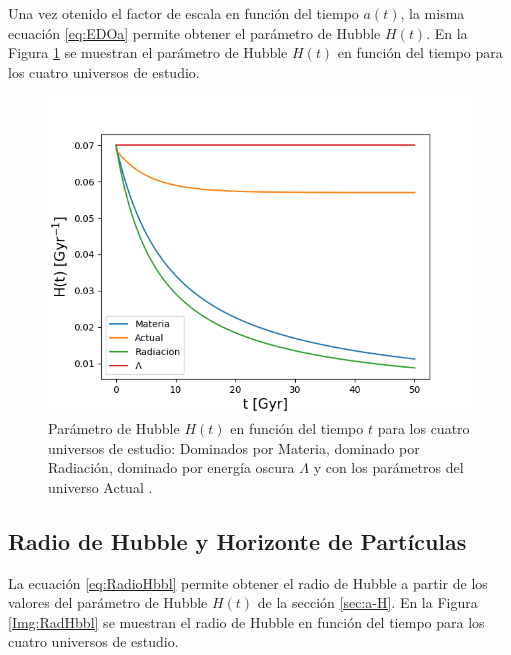 \documentclass[twoside]{article}
\begin{document}
				Una vez otenido el factor de escala en función del tiempo $a(t)$, la misma ecuación \ref{eq:EDOa} permite obtener el parámetro de Hubble $H(t)$. En la Figura \ref{Img:ParametroHbbl} se muestran el parámetro de Hubble $H(t)$ en función del tiempo para los cuatro universos de estudio.

					\begin{figure}[H]
						\centering
						\includegraphics[scale=0.6]{H(t).png}
						\caption{\label{Img:ParametroHbbl}Parámetro de Hubble $H(t)$ en función del tiempo $t$ para los cuatro universos de estudio: Dominados por \textnormal{Materia}, dominado por \textnormal{Radiación}, dominado por energía oscura $\Lambda$ y con los parámetros del universo \textnormal{Actual} \cite{Plank}.}
					\end{figure}

			\subsection{Radio de Hubble y Horizonte de Partículas}
				\label{sec:RdHbll-HztPart}

				La ecuación \ref{eq:RadioHbbl} permite obtener el radio de Hubble a partir de los valores del parámetro de Hubble $H(t)$ de la sección \ref{sec:a-H}. En la Figura \ref{Img:RadHbbl} se muestran el radio de Hubble en función del tiempo para los cuatro universos de estudio.
\end{document}
